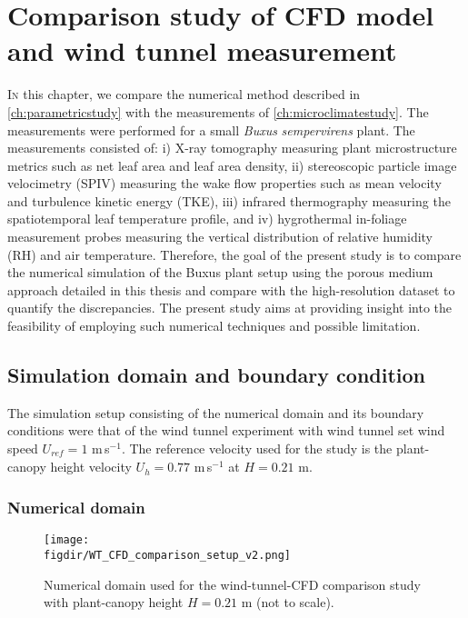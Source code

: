 \chapter{Comparison study of CFD model and wind tunnel measurement}
\label{ch:wtcfdcomparison}
\def\figdir{chapters/ch06_wtcfdcomparison/figures}	


\lettrine[lines=3,nindent=0em,loversize=0.1]{I}{n} this chapter, we compare the numerical method described in \cref{ch:parametricstudy} with the measurements of \cref{ch:microclimatestudy}. The measurements were performed for a small \textit{Buxus} \textit{sempervirens} plant. The measurements consisted of: i) X-ray tomography measuring plant microstructure metrics such as net leaf area and leaf area density, ii) stereoscopic particle image velocimetry (SPIV) measuring the wake flow properties such as mean velocity and turbulence kinetic energy (TKE), iii) infrared thermography measuring the spatiotemporal leaf temperature profile, and iv) hygrothermal in-foliage measurement probes measuring the vertical distribution of relative humidity (RH) and air temperature. Therefore, the goal of the present study is to compare the numerical simulation of the Buxus plant setup using the porous medium approach detailed in this thesis and compare with the high-resolution dataset to quantify the discrepancies. The present study aims at providing insight into the feasibility of employing such numerical techniques and possible limitation.

\section{Simulation domain and boundary condition}

The simulation setup consisting of the numerical domain and its boundary conditions were that of the wind tunnel experiment with wind tunnel set wind speed $U_{\textit{ref}} = 1$ m\,s$^{-1}$. The reference velocity used for the study is the plant-canopy height velocity $U_h = 0.77$ m\,s$^{-1}$ at $H = 0.21$ m.

\subsection{Numerical domain}
	
	\begin{figure}[t]
		\centering
		\texttt{[image: \\figdir/WT\_CFD\_comparison\_setup\_v2.png]}
		\caption{Numerical domain used for the wind-tunnel-CFD comparison study with plant-canopy height $H = 0.21$ m (not to scale).}
		\label{fig:WT_CFD_comparison_setup}
	\end{figure}

